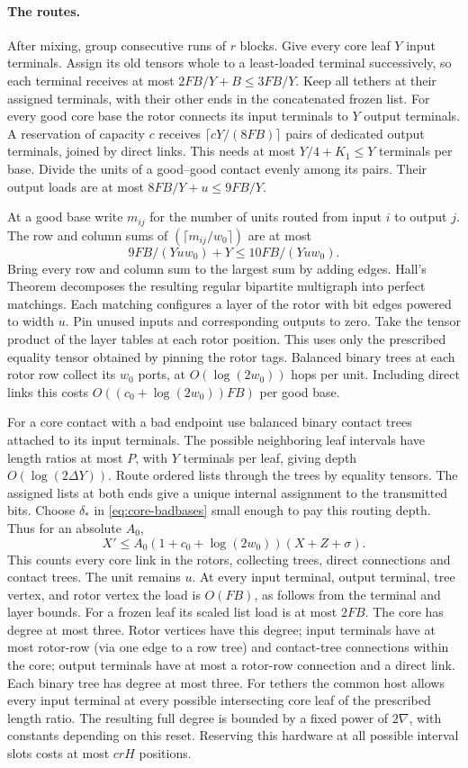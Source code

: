\paragraph{The routes.}
After mixing, group consecutive runs of \(r\) blocks. Give every core leaf \(Y\) input terminals. Assign its old tensors whole to a least-loaded terminal successively, so each terminal receives at most \(2FB/Y+B\le 3FB/Y\). Keep all tethers at their assigned terminals, with their other ends in the concatenated frozen list. For every good core base the rotor connects its input terminals to \(Y\) output terminals. A reservation of capacity \(c\) receives \(\lceil cY/(8FB)\rceil\) pairs of dedicated output terminals, joined by direct links. This needs at most \(Y/4+K_1\le Y\) terminals per base. Divide the units of a good--good contact evenly among its pairs. Their output loads are at most \(8FB/Y+u\le9FB/Y\).

At a good base write \(m_{ij}\) for the number of units routed from input \(i\) to output \(j\). The row and column sums of \((\lceil m_{ij}/w_0\rceil)\) are at most
\[
 9FB/(Yuw_0)+Y\le10FB/(Yuw_0).
\]
Bring every row and column sum to the largest sum by adding edges.
Hall's Theorem decomposes the resulting regular bipartite multigraph
into perfect matchings. Each matching configures a layer of the rotor with bit edges powered to width \(u\). Pin unused inputs and corresponding outputs to zero. Take the tensor product of the layer tables at each rotor position.
This uses only the prescribed equality tensor obtained by pinning the rotor tags. Balanced binary trees at each rotor row collect its \(w_0\) ports, at \(O(\log(2w_0))\) hops per unit. Including direct links this costs \(O((c_0+\log(2w_0))FB)\) per good base.

For a core contact with a bad endpoint use balanced binary contact trees attached to its input terminals. The possible neighboring leaf intervals have length ratios at most \(P\), with \(Y\) terminals per leaf, giving depth \(O(\log(2\Delta Y))\). Route ordered lists through the trees by equality tensors. The assigned lists at both ends give a unique internal assignment to the transmitted bits. Choose \(\delta_*\) in \eqref{eq:core-badbases} small enough to pay this routing depth. Thus for an absolute \(A_0\),
\[
 X'\le A_0(1+c_0+\log(2w_0))(X+Z+\sigma).
\]
This counts every core link in the rotors, collecting trees, direct connections and contact trees. The unit remains \(u\). At every input terminal, output terminal, tree vertex, and rotor vertex the load is \(O(FB)\), as follows from the terminal and layer bounds. For a frozen leaf its scaled list load is at most \(2FB\). The core has degree at most three. Rotor vertices have this degree; input terminals have at most rotor-row (via one edge to a row tree) and contact-tree connections within the core; output terminals have at most a rotor-row connection and a direct link. Each binary tree has degree at most three. For tethers the common host allows every input terminal at every possible intersecting core leaf of the prescribed length ratio. The resulting full degree is bounded by a fixed power of \(2\nabla\), with constants depending on this reset. Reserving this hardware at all possible interval slots costs at most \(c r H\) positions.

